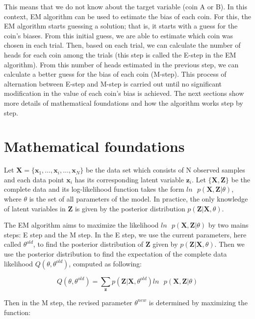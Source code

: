 This means that we do not know about the target variable (coin A or B). In this context, EM algorithm can be used to estimate the bias of each coin. For this, the EM algorithm starts guessing a solution; that is, it starts with a guess for the coin's biases. From this initial guess, we are able to estimate which coin was chosen in each trial. Then, based on each trial, we can calculate the number of heads for each coin among the trials (this step is called the E-step in the EM algorithm). From this number of heads estimated in the previous step, we can calculate a better guess for the bias of each coin (M-step). This process of alternation between E-step and M-step is carried out until no significant modification in the value of each coin's bias is achieved. The next sections show more details of mathematical foundations and how the algorithm works step by step.

\section{Mathematical foundations}
\label{sec:math}

Let $\textbf{X} = \{\textbf{x}_1,\ldots, \textbf{x}_i,\ldots, \textbf{x}_N\}$ be the data set which consists of N observed samples and each data point $\textbf{x}_i$ has its corresponding latent variable $\textbf{z}_i$.  Let $\{\textbf{X}, \textbf{Z}\}$ be the complete data and its log-likelihood function takes the form $ln \text{ }p (\textbf{X}, \textbf{Z}|\theta)$, where $\theta$ is the set of all parameters of the model. In practice, the only knowledge of latent variables in $\textbf{Z}$ is given by the posterior distribution $p (\textbf{Z}|\textbf{X}, \theta)$. 

The EM algorithm aims to maximize the likelihood
$ln \text{ }p (\textbf{X}, \textbf{Z}|\theta)$ by two mains steps: E step and the M step. In the E step, we use the current parameters, here called $\theta^{old}$, to find the posterior distribution of $\textbf{Z}$ given by $p (\textbf{Z}|\textbf{X}, \theta)$. Then we use the posterior distribution to find the expectation of the complete data likelihood $Q(\theta, \theta^{old})$, computed as following:

\begin{equation}
    Q(\theta, \theta^{old}) = \sum_{\textbf{z}} p(\textbf{Z}|\textbf{X},\theta^{old}) ln \text{ } p(\textbf{X}, \textbf{Z}|\theta)
\end{equation}

Then in the M step, the revised parameter $\theta^{new}$ is determined by maximizing the function:


